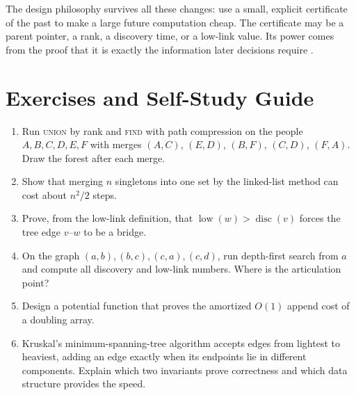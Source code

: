 The design philosophy survives all these changes: use a small, explicit certificate of the past to make a large future computation cheap. The certificate may be a parent pointer, a rank, a discovery time, or a low-link value. Its power comes from the proof that it is exactly the information later decisions require \cite{tarjan-union,tarjan-dfs}.

\section{Exercises and Self-Study Guide}
\begin{enumerate}[label=\textbf{E\arabic*.}]
\item Run \textsc{union} by rank and \textsc{find} with path compression on the people $A,B,C,D,E,F$ with merges $(A,C)$, $(E,D)$, $(B,F)$, $(C,D)$, $(F,A)$. Draw the forest after each merge.
\item Show that merging $n$ singletons into one set by the linked-list method can cost about $n^2/2$ steps.
\item Prove, from the low-link definition, that $\operatorname{low}(w)>\operatorname{disc}(v)$ forces the tree edge $v$--$w$ to be a bridge.
\item On the graph $(a,b),(b,c),(c,a),(c,d)$, run depth-first search from $a$ and compute all discovery and low-link numbers. Where is the articulation point?
\item Design a potential function that proves the amortized $O(1)$ append cost of a doubling array.
\item Kruskal's minimum-spanning-tree algorithm accepts edges from lightest to heaviest, adding an edge exactly when its endpoints lie in different components. Explain which two invariants prove correctness and which data structure provides the speed.
\end{enumerate}

\clearpage
